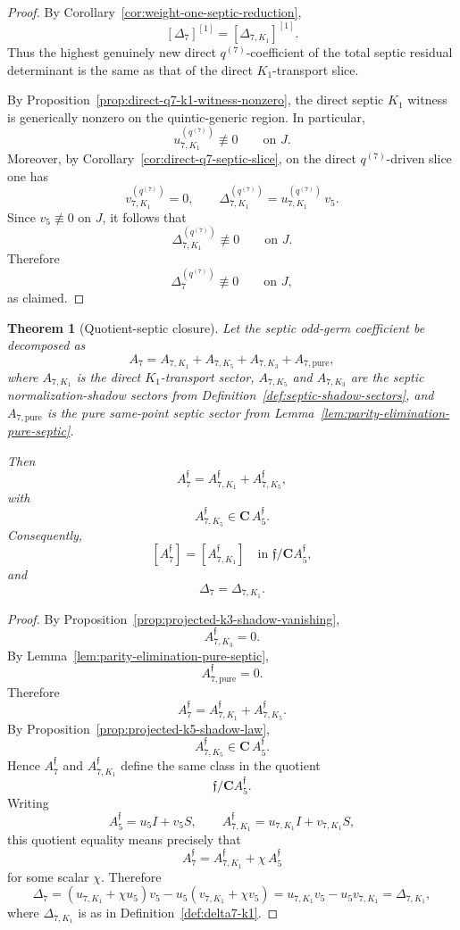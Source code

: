 \documentclass[11pt,a4paper]{amsart}
\theoremstyle{plain}
\newtheorem{theorem}{Theorem}[section]
\theoremstyle{definition}
\begin{document}
\begin{proof}
By Corollary~\ref{cor:weight-one-septic-reduction},
\[
[\Delta_7]^{[1]}=[\Delta_{7,K_1}]^{[1]}.
\]
Thus the highest genuinely new direct $q^{(7)}$-coefficient of the total
septic residual determinant is the same as that of the direct $K_1$-transport
slice.

By Proposition~\ref{prop:direct-q7-k1-witness-nonzero}, the direct septic
$K_1$ witness is generically nonzero on the quintic-generic region. In
particular,
\[
u_{7,K_1}^{(q^{(7)})}\not\equiv 0
\qquad\text{on }J.
\]
Moreover, by Corollary~\ref{cor:direct-q7-septic-slice}, on the direct
$q^{(7)}$-driven slice one has
\[
v_{7,K_1}^{(q^{(7)})}=0,
\qquad
\Delta_{7,K_1}^{(q^{(7)})}
=
u_{7,K_1}^{(q^{(7)})}\,v_5.
\]
Since $v_5\not\equiv 0$ on $J$, it follows that
\[
\Delta_{7,K_1}^{(q^{(7)})}\not\equiv 0
\qquad\text{on }J.
\]
Therefore
\[
\Delta_7^{(q^{(7)})}\not\equiv 0
\qquad\text{on }J,
\]
as claimed.
\end{proof}

\begin{theorem}[Quotient-septic closure]
\label{thm:quotient-septic-closure}
Let the septic odd-germ coefficient be decomposed as
\[
A_7=A_{7,K_1}+A_{7,K_5}+A_{7,K_3}+A_{7,\mathrm{pure}},
\]
where $A_{7,K_1}$ is the direct $K_1$-transport sector,
$A_{7,K_5}$ and $A_{7,K_3}$ are the septic normalization-shadow sectors
from Definition~\ref{def:septic-shadow-sectors}, and
$A_{7,\mathrm{pure}}$ is the pure same-point septic sector from
Lemma~\ref{lem:parity-elimination-pure-septic}.

Then
\[
A_7^{\mathfrak f}
=
A_{7,K_1}^{\mathfrak f}+A_{7,K_5}^{\mathfrak f},
\]
with
\[
A_{7,K_5}^{\mathfrak f}\in \mathbf C\,A_5^{\mathfrak f}.
\]
Consequently,
\[
[A_7^{\mathfrak f}]
=
[A_{7,K_1}^{\mathfrak f}]
\quad\text{in }\mathfrak f/\mathbf C A_5^{\mathfrak f},
\]
and
\[
\Delta_7=\Delta_{7,K_1}.
\]
\end{theorem}

\begin{proof}
By Proposition~\ref{prop:projected-k3-shadow-vanishing},
\[
A_{7,K_3}^{\mathfrak f}=0.
\]
By Lemma~\ref{lem:parity-elimination-pure-septic},
\[
A_{7,\mathrm{pure}}^{\mathfrak f}=0.
\]
Therefore
\[
A_7^{\mathfrak f}
=
A_{7,K_1}^{\mathfrak f}+A_{7,K_5}^{\mathfrak f}.
\]
By Proposition~\ref{prop:projected-k5-shadow-law},
\[
A_{7,K_5}^{\mathfrak f}\in \mathbf C\,A_5^{\mathfrak f}.
\]
Hence $A_7^{\mathfrak f}$ and $A_{7,K_1}^{\mathfrak f}$ define the same
class in the quotient
\[
\mathfrak f/\mathbf C A_5^{\mathfrak f}.
\]
Writing
\[
A_5^{\mathfrak f}=u_5I+v_5S,
\qquad
A_{7,K_1}^{\mathfrak f}=u_{7,K_1}I+v_{7,K_1}S,
\]
this quotient equality means precisely that
\[
A_7^{\mathfrak f}
=
A_{7,K_1}^{\mathfrak f}+\chi\,A_5^{\mathfrak f}
\]
for some scalar $\chi$. Therefore
\[
\Delta_7
=
(u_{7,K_1}+\chi u_5)v_5-u_5(v_{7,K_1}+\chi v_5)
=
u_{7,K_1}v_5-u_5v_{7,K_1}
=
\Delta_{7,K_1},
\]
where $\Delta_{7,K_1}$ is as in Definition~\ref{def:delta7-k1}.
\end{proof}
\end{document}
